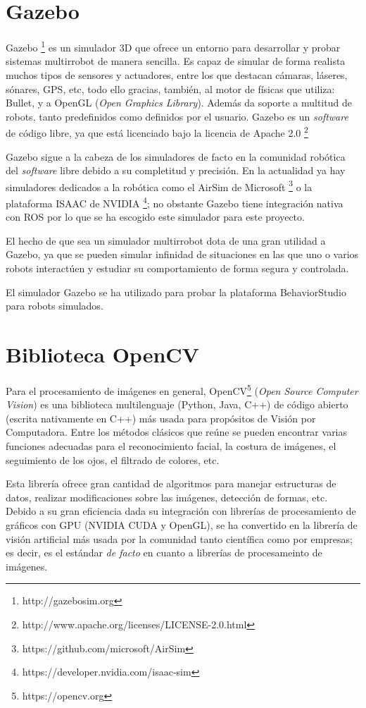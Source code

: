 \section{Gazebo}

Gazebo \footnote{http://gazebosim.org} es un simulador 3D que ofrece un entorno para desarrollar y probar sistemas multirrobot de manera sencilla. Es capaz de simular de forma realista muchos tipos de sensores y actuadores, entre los que destacan cámaras, láseres, sónares, GPS, etc, todo ello gracias, también, al motor de físicas que utiliza: Bullet, y a OpenGL (\textit{Open Graphics Library}). Además da soporte a multitud de robots, tanto predefinidos como definidos por el usuario. Gazebo es un \textit{software} de código libre, ya que está licenciado bajo la licencia de Apache 2.0 \footnote{http://www.apache.org/licenses/LICENSE-2.0.html}

Gazebo sigue a la cabeza de los simuladores de facto en la comunidad robótica del \textit{software} libre debido a su completitud y precisión. En la actualidad ya hay simuladores dedicados a la robótica como el AirSim de Microsoft \footnote{https://github.com/microsoft/AirSim} o la plataforma ISAAC de NVIDIA \footnote{https://developer.nvidia.com/isaac-sim}; no obstante Gazebo tiene integración nativa con ROS por lo que se ha escogido este simulador para este proyecto.

El hecho de que sea un simulador multirrobot dota de una gran utilidad a Gazebo, ya que se pueden simular infinidad de situaciones en las que uno o varios robots interactúen y estudiar su comportamiento de forma segura y controlada.

El simulador Gazebo se ha utilizado para probar la plataforma BehaviorStudio para robots simulados.

\section{Biblioteca OpenCV}

Para el procesamiento de imágenes en general, OpenCV\footnote{https://opencv.org} (\textit{Open Source Computer Vision}) es una biblioteca multilenguaje (Python, Java, C++) de código abierto (escrita nativamente en C++) más usada para propósitos de Visión por Computadora. Entre los métodos clásicos que reúne se pueden encontrar varias funciones adecuadas para el reconocimiento facial, la costura de imágenes, el seguimiento de los ojos, el filtrado de colores, etc.

Esta librería ofrece gran cantidad de algoritmos para manejar estructuras de datos, realizar modificaciones sobre las imágenes, detección de formas, etc. Debido a su gran eficiencia dada su integración con librerías de procesamiento de gráficos con GPU (NVIDIA CUDA y OpenGL), se ha convertido en la librería de visión artificial más usada por la comunidad tanto científica como por empresas; es decir, es el estándar \textit{de facto} en cuanto a librerías de procesameinto de imágenes.

